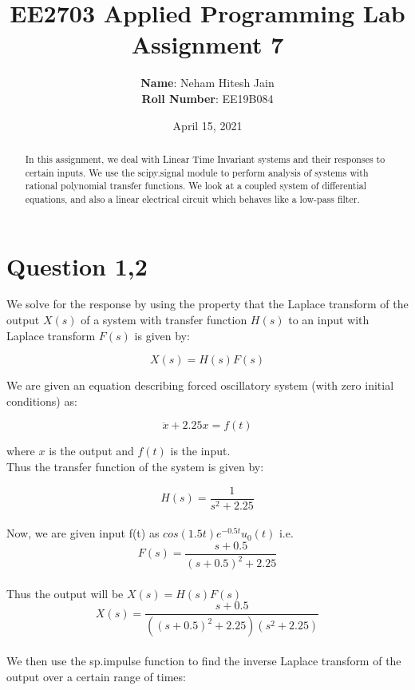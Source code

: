 \documentclass{article}
\title{EE2703 Applied Programming Lab \\ Assignment 7}
\author{
  \textbf{Name}: Neham Hitesh Jain\\
  \textbf{Roll Number}: EE19B084
}\date{April 15, 2021}
\begin{document}
\maketitle
\newpage

\begin{abstract}

In this assignment, we deal with Linear Time Invariant systems and their
responses to certain inputs. We use the scipy.signal module to perform
analysis of systems with rational polynomial transfer functions. We look
at a coupled system of differential equations, and also a linear
electrical circuit which behaves like a low-pass filter.

\end{abstract}

\section*{Question 1,2}\label{question-1}

We solve for the response by using the property that the Laplace
transform of the output \(X(s)\) of a system with transfer function
\(H(s)\) to an input with Laplace transform \(F(s)\) is given by:

\[X(s) = H(s) F(s)\]

\noindent
We are given an equation describing forced oscillatory system (with zero initial conditions) as:

\begin{equation}
    \ddot x + 2.25x = f(t)
\end{equation}

where $x$ is the output and $f(t)$ is the input.
\\

\noindent
Thus the transfer function of the system is given by:

\begin{equation}
   H(s) = \frac{1}{s^2+2.25}
\end{equation}
\\
Now, we are given input f(t) as $cos(1.5t)e^{-0.5t}u_0(t)$ i.e.
\begin{equation}
   F(s) = \frac{s+0.5}{(s+0.5)^2+2.25}
\end{equation}
\\
\noindent
Thus the output will be $X(s) = H(s)F(s)$
\begin{equation}
   X(s) = \frac{s+0.5}{((s+0.5)^2+2.25)(s^2+2.25)}
\end{equation}
\\
\noindent
We then use the sp.impulse function to find the inverse Laplace
transform of the output over a certain range of times:
\end{document}

